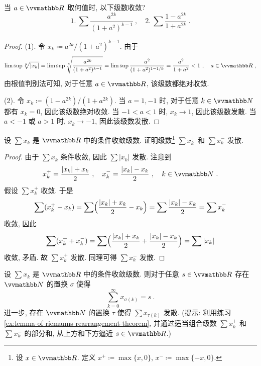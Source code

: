 \begin{exercise}
    当 \(a \in \R\) 取何值时, 以下级数收敛?
    \[
        1.\ \sum \frac{a^{2 k}}{(1 + a^2)^{k - 1}}\ ,\quad 2.\ \sum \frac{1 - a^{2 k}}{1 + a^{2 k}}\ .
    \]
\end{exercise}

\begin{proof}
    (1). 令 \(x_k \coloneqq a^{2 k} / (1 + a^2)^{k - 1}\). 由于
    \[
        \limsup \sqrt[k]{|x_k|} = \limsup \sqrt[k]{\frac{a^{2 k}}{(1 + a^2)^{k - 1}}} = \limsup \frac{a^2}{(1 + a^2)^{1 - 1 / k}} = \frac{a^2}{1 + a^2} < 1\ ,\quad a \in \R\ ,
    \]
    由根值判别法可知, 对于任意 \(a \in \R\), 该级数都绝对收敛.

    (2). 令 \(x_k \coloneqq (1 - a^{2 k}) / (1 + a^{2 k})\). 当 \(a = 1, - 1\) 时, 对于任意 \(k \in \N\) 都有 \(x_k = 0\), 因此该级数绝对收敛. 当 \(- 1 < a < 1\) 时, \(x_k \to 1\), 因此该级数发散. 当 \(a < - 1\) 或 \(a > 1\) 时, \(x_k \to - 1\), 因此该级数发散.
\end{proof}

\begin{exercise}\label{ex:lemma-of-riemanns-rearrangement-theorem}
    设 \(\sum x_k\) 是 \(\R\) 中的条件收敛级数. 证明级数\footnote{设 \(x \in \R\). 定义 \(x^+ \coloneqq \max\{x, 0\}\), \(x^- \coloneqq \max\{- x, 0\}\).} \(\sum x_k^+\) 和 \(\sum x_k^-\) 发散.
\end{exercise}

\begin{proof}
    由于 \(\sum x_k\) 条件收敛, 因此 \(\sum |x_k|\) 发散. 注意到
    \[
        x_k^+ = \frac{|x_k| + x_k}{2}\ ,\quad x_k^- = \frac{|x_k| - x_k}{2}\ ,\quad k \in \N\ .
    \]
    假设 \(\sum x_k^+\) 收敛. 于是
    \[
        \sum (x_k^+ - x_k) = \sum \Bigl( \frac{|x_k| + x_k}{2} - x_k \Bigr) = \sum \frac{|x_k| - x_k}{2} = \sum x_k^-
    \]
    收敛, 因此
    \[
        \sum (x_k^+ + x_k^-) = \sum \Bigl( \frac{|x_k| + x_k}{2} + \frac{|x_k| - x_k}{2} \Bigr) = \sum |x_k|
    \]
    收敛, 矛盾. 故 \(\sum x_k^+\) 发散. 同理可得 \(\sum x_k^-\) 发散.
\end{proof}

\begin{exercise}\label{ex:riemanns-rearrangement-theorem}
    设 \(\sum x_k\) 是 \(\R\) 中的条件收敛级数. 则对于任意 \(s \in \R\) 存在 \(\N\) 的置换 \(\sigma\) 使得
    \[
        \sum_{k = 0}^\infty x_{\sigma(k)} = s\ .
    \]
    进一步, 存在 \(\N\) 的置换 \(\tau\) 使得 \(\sum x_{\tau(k)}\) 发散. (提示: 利用练习 \ref{ex:lemma-of-riemanns-rearrangement-theorem}, 并通过适当组合级数 \(\sum x_k^+\) 和 \(\sum x_k^-\) 的部分和, 从上方和下方逼近 \(s \in \R\).)
\end{exercise}

